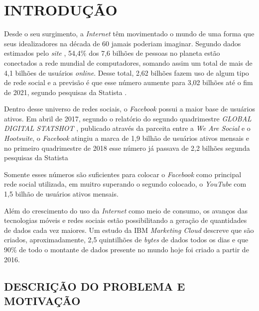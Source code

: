 
%

\chapter{INTRODUÇÃO}
\label{chap:introducao}

Desde o seu surgimento, a \textit{Internet} têm movimentado o mundo de uma forma que seus idealizadores na década de 60 jamais poderiam imaginar. Segundo dados estimados pelo \textit{site} , 54,4\% dos 7,6 bilhões de pessoas no planeta estão conectados a rede mundial de computadores, somando assim um total de mais de 4,1 bilhões de usuários \textit{online}. Desse total, 2,62 bilhões fazem uso de algum tipo de rede social e a previsão é que esse número aumente para 3,02 bilhões até o fim de 2021, segundo pesquisas da Statista .

Dentro desse universo de redes sociais, o \textit{Facebook} possui a maior base de usuários ativos. Em abril de 2017, segundo o relatório do segundo quadrimestre \textit{GLOBAL DIGITAL STATSHOT} , publicado através da parceita entre a \textit{We Are Social} e o \textit{Hootsuite}, o \textit{Facebook} atingiu a marca de 1,9 bilhão de usuários ativos mensais e no primeiro quadrimestre de 2018 esse número já passava de 2,2 bilhões segunda pesquisas da Statista 

Somente esses números são suficientes para colocar o \textit{Facebook} como principal rede social utilizada, em muitro superando o segundo colocado, o \textit{YouTube} com 1,5 bilhão de usuários ativos mensais. 

Além do crescimento do uso da \textit{Internet} como meio de consumo, os avanços das tecnologias móveis e redes sociais estão possibilitando a geração de quantidades de dados cada vez maiores. Um estudo da IBM \textit{Marketing Cloud}  descreve que são criados, aproximadamente, 2,5 quintilhões de \textit{bytes} de dados todos os dias e que 90\% de todo o montante de dados presente no mundo hoje foi criado a partir de 2016.

\section{DESCRIÇÃO DO PROBLEMA E MOTIVAÇÃO}
\label{sec:descricaomotivacao}

